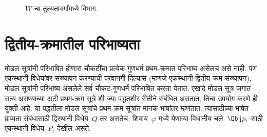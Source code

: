 \begin{figure}[t]
  \centering
  \caption{$W$ चा तुल्यतावर्गांमध्ये विभाग.}
  \label{nml:frd:es5:fig:partition}
\end{figure}













\section{द्वितीय-क्रमातील परिभाष्यता}\label{nml:frd:st:sec}

मोडल सूत्रांनी परिभाषित होणारा चौकटींचा प्रत्येक गुणधर्म
प्रथम-क्रमात परिभाष्य असेलच असे नाही. पण एकस्थानी
विधेयांवर संख्यापन करण्याची परवानगी दिल्यास (म्हणजे
एकस्थानी द्वितीय-क्रम संख्यापन), मोडल सूत्रांनी परिभाष्य
असलेले सर्व चौकट-गुणधर्म परिभाषित करता येतात.
एखादे मोडल सूत्र जगात सत्य असण्याच्या अटी
प्रथम-क्रम सूत्रे शी ज्या पद्धतशीर रीतीने
संबंधित असतात, तिचा उपयोग करणे ही युक्ती आहे.
या पद्धतीला मोडल सूत्रांचे प्रथम-क्रम सूत्रांत
मानक भाषांतर म्हणतात. त्यासाठीच्या भाषेत
प्राप्यता संबंधासाठी द्विस्थानी विधेय~$Q$
तर असतेच, शिवाय~$\varphi$ मध्ये येणाऱ्या
विधानीय चले~$\Obj p_i$ साठी
एकस्थानी विधेय~$P_i$ देखील असते.


